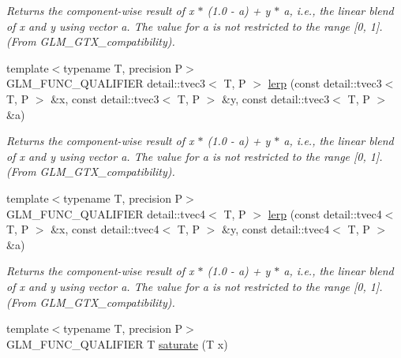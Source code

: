 \begin{CompactItemize}
\begin{CompactList}\small\item\em Returns the component-wise result of x $\ast$ (1.0 - a) + y $\ast$ a, i.e., the linear blend of x and y using vector a. The value for a is not restricted to the range \mbox{[}0, 1\mbox{]}. (From GLM\_\-GTX\_\-compatibility). \item\end{CompactList}\item 
\hypertarget{group__gtx__compatibility_g37451637585efa0717dd1a819d7ad193}{
{\footnotesize template$<$typename T, precision P$>$ }\\GLM\_\-FUNC\_\-QUALIFIER detail::tvec3$<$ T, P $>$ \hyperlink{group__gtx__compatibility_g37451637585efa0717dd1a819d7ad193}{lerp} (const detail::tvec3$<$ T, P $>$ \&x, const detail::tvec3$<$ T, P $>$ \&y, const detail::tvec3$<$ T, P $>$ \&a)}
\label{group__gtx__compatibility_g37451637585efa0717dd1a819d7ad193}

\begin{CompactList}\small\item\em Returns the component-wise result of x $\ast$ (1.0 - a) + y $\ast$ a, i.e., the linear blend of x and y using vector a. The value for a is not restricted to the range \mbox{[}0, 1\mbox{]}. (From GLM\_\-GTX\_\-compatibility). \item\end{CompactList}\item 
\hypertarget{group__gtx__compatibility_g0155a663082f1a46246944249b47f584}{
{\footnotesize template$<$typename T, precision P$>$ }\\GLM\_\-FUNC\_\-QUALIFIER detail::tvec4$<$ T, P $>$ \hyperlink{group__gtx__compatibility_g0155a663082f1a46246944249b47f584}{lerp} (const detail::tvec4$<$ T, P $>$ \&x, const detail::tvec4$<$ T, P $>$ \&y, const detail::tvec4$<$ T, P $>$ \&a)}
\label{group__gtx__compatibility_g0155a663082f1a46246944249b47f584}

\begin{CompactList}\small\item\em Returns the component-wise result of x $\ast$ (1.0 - a) + y $\ast$ a, i.e., the linear blend of x and y using vector a. The value for a is not restricted to the range \mbox{[}0, 1\mbox{]}. (From GLM\_\-GTX\_\-compatibility). \item\end{CompactList}\item 
\hypertarget{group__gtx__compatibility_g3f1e08f6c126c7e3585c36c32c108284}{
{\footnotesize template$<$typename T, precision P$>$ }\\GLM\_\-FUNC\_\-QUALIFIER T \hyperlink{group__gtx__compatibility_g3f1e08f6c126c7e3585c36c32c108284}{saturate} (T x)}
\label{group__gtx__compatibility_g3f1e08f6c126c7e3585c36c32c108284}


\end{CompactItemize}

